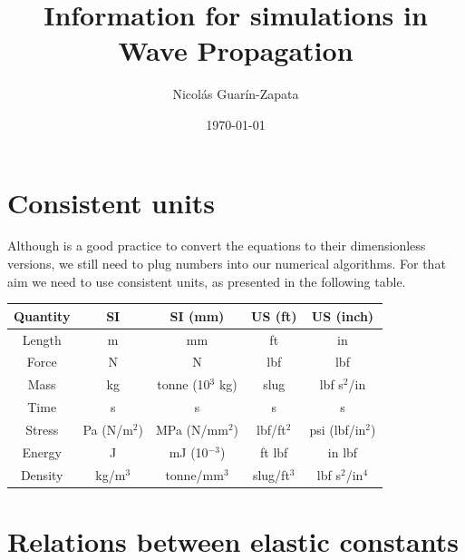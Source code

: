 \documentclass[12pt,letterpaper]{article}
\title{\textbf{Information for simulations in Wave Propagation}}
\author{Nicol\'as Guar\'in-Zapata}
\date{\today}
\begin{document}
\maketitle

\section{Consistent units}
Although is a good practice to convert the equations to their dimensionless versions, we still need to plug numbers into our numerical algorithms. For that aim we need to use consistent units, as presented in the following table.
\begin{table}[h]
\centering
\begin{tabular}{|c|c|c|c|c|}
\hline 
\textbf{Quantity} & \textbf{SI} & \textbf{SI (mm)} & \textbf{US (ft)} & \textbf{US (inch)} \\ 
\hline 
Length & m & mm & ft & in \\ 
\hline 
Force & N & N & lbf & lbf \\ 
\hline 
Mass & kg & tonne (10$^3$ kg) & slug & lbf s$^2$/in \\ 
\hline 
Time & s & s & s & s \\ 
\hline 
Stress & Pa (N/m$^2$) & MPa (N/mm$^2$) & lbf/ft$^2$ & psi (lbf/in$^2$) \\ 
\hline 
Energy & J & mJ (10$^{-3}$) & ft lbf & in lbf \\ 
\hline 
Density & kg/m$^3$ & tonne/mm$^3$ & slug/ft$^3$ & lbf s$^2$/in$^4$ \\ 
\hline 
\end{tabular}
\end{table} 

\section{Relations between elastic constants}
\end{document}
